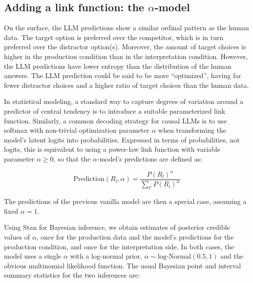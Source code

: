 \documentclass{article}
\begin{document}
\subsection{Adding a link function: the \(\alpha\)-model}
\label{adding-a-link-function-the-alpha-model}



On the surface, the LLM predictions show a similar ordinal pattern as the human data.
The target option is preferred over the competitor, which is in turn preferred over the distractor option(s).
Moreover, the amount of target choices is higher in the production condition than in the interpretation condition.
However, the LLM predictions have lower entropy than the distribution of the human answers.
The LLM prediction could be said to be more ``optimized'', having far fewer distractor choices and a higher ratio of target choices than the human data.

In statistical modeling, a standard way to capture degrees of variation around a predictor of central tendency is to introduce a suitable parameterized link function.
Similarly, a common decoding strategy for causal LLMs is to use softmax with non-trivial optimization parameter $\alpha$ when transforming the model's latent logits into probabilities.
Expressed in terms of probabilities, not logits, this is equivalent to using a power-law link function \citep{WorthyMaddox2008:Ratio-and-Diffe} with variable parameter \(\alpha \ge 0\), so that the $\alpha$-model's predictions are defined as:

\[\text{Prediction}(R_{l}, \alpha) = \frac{P(R_{l})^\alpha}{\sum_{l'} P(R_{l})^\alpha}\]

The predictions of the previous vanilla model are then a special case, assuming a fixed \(\alpha =1\).

Using Stan \citep{Team2023:The-Stan-Core-L} for Bayesian inference, we obtain estimates of posterior credible values of \(\alpha\), once for the production data and the model's predictions for the production condition, and once for the interpretation side.
In both cases, the model uses a single \(\alpha\) with a log-normal prior, \(\alpha \sim \text{log-Normal}(0.5,1)\) and the obvious multinomial likelihood function.
The usual Bayesian point and interval summary statistics for the two inferences are: 
\end{document}
